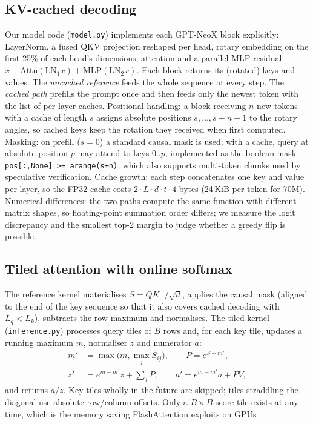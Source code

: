 

\subsection{KV-cached decoding}
Our model code (\texttt{model.py}) implements each GPT-NeoX block explicitly: LayerNorm, a fused QKV projection reshaped per head, rotary embedding on the first 25\% of each head's dimensions, attention and a parallel MLP residual $x+\mathrm{Attn}(\mathrm{LN}_1x)+\mathrm{MLP}(\mathrm{LN}_2x)$. Each block returns its (rotated) keys and values. The \emph{uncached reference} feeds the whole sequence at every step. The \emph{cached path} prefills the prompt once and then feeds only the newest token with the list of per-layer caches. Positional handling: a block receiving $n$ new tokens with a cache of length $s$ assigns absolute positions $s,\ldots,s{+}n{-}1$ to the rotary angles, so cached keys keep the rotation they received when first computed. Masking: on prefill ($s{=}0$) a standard causal mask is used; with a cache, query at absolute position $p$ may attend to keys $0..p$, implemented as the boolean mask \texttt{pos[:,None] >= arange(s+n)}, which also supports multi-token chunks used by speculative verification. Cache growth: each step concatenates one key and value per layer, so the FP32 cache costs $2\cdot L\cdot d\cdot t\cdot 4$ bytes (24\,KiB per token for 70M). Numerical differences: the two paths compute the same function with different matrix shapes, so floating-point summation order differs; we measure the logit discrepancy and the smallest top-2 margin to judge whether a greedy flip is possible.

\subsection{Tiled attention with online softmax}
The reference kernel materialises $S=QK^\top/\sqrt{d}$, applies the causal mask (aligned to the end of the key sequence so that it also covers cached decoding with $L_q<L_k$), subtracts the row maximum and normalises. The tiled kernel (\texttt{inference.py}) processes query tiles of $B$ rows and, for each key tile, updates a running maximum $m$, normaliser $z$ and numerator $a$:
\begin{align}
m'&=\max\big(m,\textstyle\max_j S_{ij}\big),\qquad P=e^{S-m'},\nonumber\\
z'&=e^{m-m'}z+\textstyle\sum_j P,\qquad a'=e^{m-m'}a+PV,
\end{align}
and returns $a/z$. Key tiles wholly in the future are skipped; tiles straddling the diagonal use absolute row/column offsets. Only a $B\times B$ score tile exists at any time, which is the memory saving FlashAttention exploits on GPUs~\cite{flash}.

